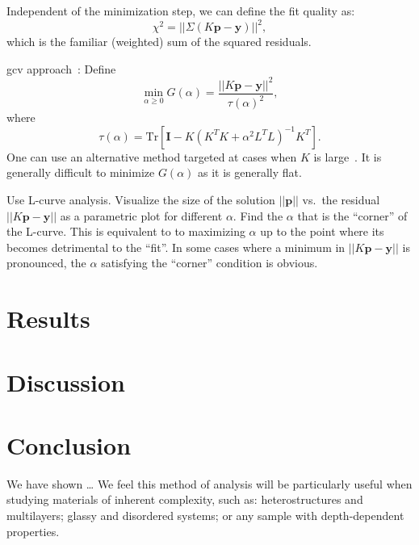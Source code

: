 \documentclass[
  aps,
  prb,
  twocolumn,
  reprint,
  superscriptaddress,
  floatfix,
  citeautoscript,
  longbibliography,
]{revtex4-2}
\begin{document}
Independent of the minimization step, we can define the fit quality as:
\begin{equation}
   \chi^{2} = || \Sigma \left ( K \mathbf{p} - \mathbf{y} \right ) ||^{2} ,
\end{equation}
which is the familiar (weighted) sum of the squared residuals.




\gls{gcv} approach~\cite{1978-Craven-NM-31-377}:
Define
\begin{equation}
\label{eq:gcv}
   \min_{\alpha \geq 0} G ( \alpha ) = \frac{ || K \mathbf{p} - \mathbf{y} ||^{2} }{ \tau ( \alpha )^{2} } ,
\end{equation}
where
\begin{equation}
   \tau ( \alpha ) = \mathrm{Tr} \left [ \mathbf{I} - K \left ( K^{T} K + \alpha^{2} L^{T} L \right )^{-1} K^{T} \right ] .
\end{equation}
One can use an alternative method targeted at cases when $K$ is large~\cite{1997-Golub-JCGS-6-1}.
It is generally difficult to minimize $G ( \alpha )$ as it is generally flat.



Use L-curve analysis.
Visualize the size of the solution $|| \mathbf{p} ||$ vs.\ the residual $|| K \mathbf{p} - \mathbf{y} ||$ as a parametric plot for different $\alpha$.
Find the $\alpha$ that is the ``corner'' of the L-curve.
This is equivalent to to maximizing $\alpha$ up to the point where its becomes detrimental to the ``fit''.
In some cases where a minimum in $|| K \mathbf{p} - \mathbf{y} ||$ is pronounced, the $\alpha$ satisfying the ``corner'' condition is obvious.



\section{Results \label{sec:results}}


\section{Discussion \label{sec:discussion}}


\section{Conclusion \label{sec:conclusion}}

We have shown \dots
We feel this method of analysis will be particularly useful when studying materials of inherent complexity, such as:
heterostructures and multilayers;
glassy and disordered systems;
or any sample with depth-dependent properties.
\end{document}
